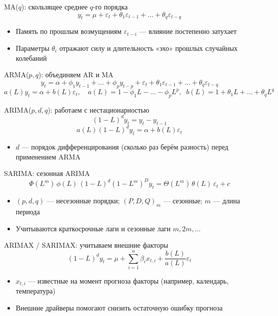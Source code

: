 \documentclass[aspectratio=1610,12pt]{beamer}
\begin{document}
\begin{frame}{MA($q$): скользящее среднее $q$-го порядка}
\[
y_t = \mu + \varepsilon_t + \theta_1 \varepsilon_{t-1} + \dots + \theta_q \varepsilon_{t-q}
\]
\begin{itemize}
  \item Память по прошлым возмущениям $\varepsilon_{t-i}$ — влияние постепенно затухает
  \item Параметры $\theta_i$ отражают силу и длительность «эхо» прошлых случайных колебаний
\end{itemize}
\end{frame}

\begin{frame}{ARMA($p,q$): объединяем AR и MA}
\[
y_t = \alpha + \phi_1 y_{t-1} + \dots + \phi_p y_{t-p}
      + \varepsilon_t + \theta_1 \varepsilon_{t-1} + \dots + \theta_q \varepsilon_{t-q}
\]
\[
a(L) y_t = \alpha + b(L)\varepsilon_t,\quad
a(L)=1-\phi_1L-\dots-\phi_p L^p,\;\; b(L)=1+\theta_1L+\dots+\theta_qL^q
\]
\end{frame}

\begin{frame}{ARIMA($p,d,q$): работаем с нестационарностью}
\[
(1-L)^d y_t = y_t - y_{t-1}
\]
\[
a(L)(1-L)^d y_t = \alpha + b(L)\varepsilon_t
\]
\begin{itemize}
  \item $d$ — порядок дифференцирования (сколько раз берём разность) перед применением ARMA
\end{itemize}
\end{frame}

\begin{frame}{SARIMA: сезонная ARIMA}
\small
\[
\Phi(L^m)\,\phi(L)\,(1-L)^d(1-L^m)^D y_t = \Theta(L^m)\,\theta(L)\,\varepsilon_t + c
\]
\begin{itemize}
  \item $(p,d,q)$ — несезонные порядки; $(P,D,Q)_m$ — сезонные; $m$ — длина периода
  \item Учитываются краткосрочные лаги и сезонные лаги $m,2m,\dots$
\end{itemize}
\end{frame}

\begin{frame}{ARIMAX / SARIMAX: учитываем внешние факторы}
\[
(1-L)^d y_t = \mu + \sum_{i=1}^{n} \beta_i x_{t,i} + \frac{b(L)}{a(L)} \varepsilon_t
\]
\begin{itemize}
  \item $x_{t,i}$ — известные на момент прогноза факторы (например, календарь, температура)
  \item Внешние драйверы помогают снизить остаточную ошибку прогноза
\end{itemize}
\end{frame}
\end{document}
